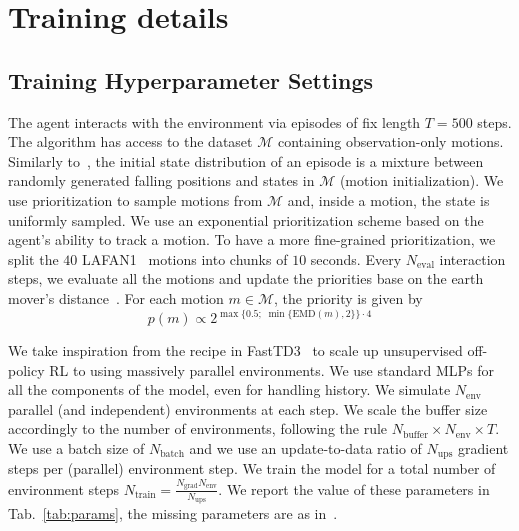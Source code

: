 
\section{Training details}
\subsection{Training Hyperparameter Settings}
The agent interacts with the environment via episodes of fix length $T = 500$ steps. The algorithm has access to the dataset $\mathcal{M}$ containing observation-only motions. Similarly to~\citep{TirinzoniTFGKXL25zeroshot}, the initial state distribution of an episode is a mixture between randomly generated falling positions and states in $\mathcal{M}$ (motion initialization). We use prioritization to sample motions from $\mathcal{M}$ and, inside a motion, the state is uniformly sampled. We use an exponential prioritization scheme based on the agent's ability to track a motion. To have a more fine-grained prioritization, we split the $40$ LAFAN1~\citep{HarveyYNP20lafan1} motions into chunks of $10$ seconds. 
Every $N_{\mathrm{eval}}$ interaction steps, we evaluate all the motions and update the priorities base on the earth mover’s distance~\citep[EMD]{RubnerTG00}. For each motion $m \in \mathcal{M}$, the priority is given by
\[
p(m) \propto 2^{\max\Big\{0.5;\;\min\big\{\mathrm{EMD}(m), 2\big\}\Big\} \cdot 4}
\]

We take inspiration from the recipe in FastTD3~\citep{Seo2025fasttd3} to scale up unsupervised off-policy RL to using massively parallel environments. We use standard MLPs for all the components of the model, even for handling history. We simulate $N_{\mathrm{env}}$ parallel (and independent) environments at each step. We scale the buffer size accordingly to the number of environments, following the rule $N_{\mathrm{buffer}} \times N_{\mathrm{env}} \times T$. We use a batch size of $N_{\mathrm{batch}}$ and we use an update-to-data ratio of $N_{\mathrm{ups}}$ gradient steps per (parallel) environment step. We train the model for a total number of environment steps $N_{\mathrm{train}} = \frac{N_{\mathrm{grad}}N_{\mathrm{env}}}{N_{\mathrm{ups}}}$. We report the value of these parameters in Tab.~\ref{tab:params}, the missing parameters are as in~\citep{TirinzoniTFGKXL25zeroshot}.

